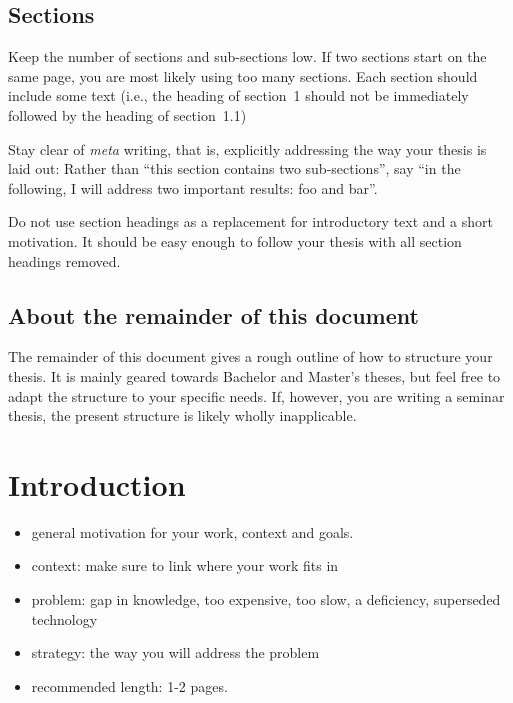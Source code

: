 \documentclass[]{ccs-thesis}
\begin{document}
\section{Sections}

Keep the number of sections and sub-sections low.
If two sections start on the same page, you are most likely using too many sections.
Each section should include some text (i.e., the heading of section~1 should not be immediately followed by the heading of section~1.1)

Stay clear of \emph{meta} writing, that is, explicitly addressing the way your thesis is laid out:
Rather than ``this section contains two sub-sections'', say ``in the following, I will address two important results: foo and bar''.

Do not use section headings as a replacement for introductory text and a short motivation.
It should be easy enough to follow your thesis with all section headings removed.


\section{About the remainder of this document}

The remainder of this document gives a rough outline of how to structure your thesis.
It is mainly geared towards Bachelor and Master's theses, but feel free to adapt the structure to your specific needs.
If, however, you are writing a seminar thesis, the present structure is likely wholly inapplicable.


\chapter{Introduction}
\label{sec:introduction}

\begin{itemize}
\item general motivation for your work, context and goals.
\item context: make sure to link where your work fits in
\item problem: gap in knowledge, too expensive, too slow, a deficiency, superseded technology
\item strategy: the way you will address the problem
\item recommended length: 1-2 pages.
\end{itemize}
\end{document}
